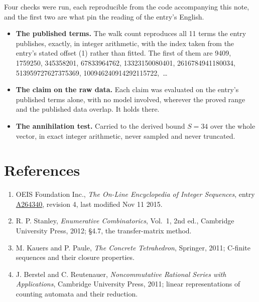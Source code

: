\documentclass[11pt]{article}
\theoremstyle{definition}
\begin{document}
Four checks were run, each reproducible from the code accompanying this note, and the first two are what pin the reading of the entry's English.

\begin{itemize}

\item {\bfseries The published terms.} The walk count reproduces all 11 terms the entry publishes, exactly, in integer arithmetic, with the index taken from the entry's stated offset (1) rather than fitted. The first of them are 9409, 1759250, 345358201, 67833964762, 13323150080401, 2616784941180034, 513959727627375369, 100946240914292115722,~\dots

\item {\bfseries The claim on the raw data.} Each claim was evaluated on the entry's published terms alone, with no model involved, wherever the proved range and the published data overlap. It holds there.

\item {\bfseries The annihilation test.} Carried to the derived bound $S = 34$ over the whole vector, in exact integer arithmetic, never sampled and never truncated.

\end{itemize}

\section{References}

\begin{enumerate}

\item OEIS Foundation Inc., \emph{The On-Line Encyclopedia of Integer Sequences}, entry \href{https://oeis.org/A264340}{A264340}, revision 4, last modified Nov 11 2015.

\item R. P. Stanley, \emph{Enumerative Combinatorics}, Vol.~1, 2nd ed., Cambridge University Press, 2012; \S4.7, the transfer-matrix method.

\item M. Kauers and P. Paule, \emph{The Concrete Tetrahedron}, Springer, 2011; C-finite sequences and their closure properties.

\item J. Berstel and C. Reutenauer, \emph{Noncommutative Rational Series with Applications}, Cambridge University Press, 2011; linear representations of counting automata and their reduction.

\end{enumerate}
\end{document}

